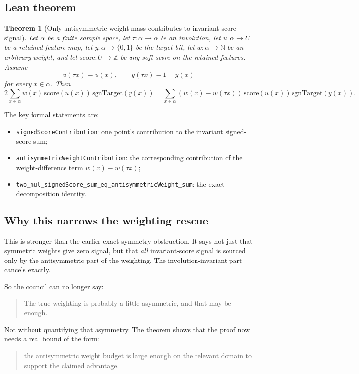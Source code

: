 \documentclass[11pt]{article}
\newtheorem{theorem}{Theorem}[section]
\theoremstyle{remark}
\begin{document}
\subsection{Lean theorem}

\begin{theorem}[Only antisymmetric weight mass contributes to invariant-score signal]
Let \(\alpha\) be a finite sample space, let \(\tau : \alpha \to \alpha\) be an involution, let
\(u : \alpha \to U\) be a retained feature map, let \(y : \alpha \to \{0,1\}\) be the target bit,
let \(w : \alpha \to \mathbb{N}\) be an arbitrary weight, and let
\(\mathrm{score} : U \to \mathbb{Z}\) be any soft score on the retained features.  Assume
\[
  u(\tau x) = u(x), \qquad y(\tau x) = 1-y(x)
\]
for every \(x \in \alpha\).  Then
\[
  2 \sum_{x \in \alpha} w(x)\,\mathrm{score}(u(x))\,\mathrm{sgnTarget}(y(x))
  =
  \sum_{x \in \alpha} (w(x)-w(\tau x))\,\mathrm{score}(u(x))\,\mathrm{sgnTarget}(y(x)).
\]
\end{theorem}

\noindent
The key formal statements are:
\begin{itemize}[leftmargin=1.5em]
  \item \texttt{signedScoreContribution}: one point's contribution to the invariant signed-score
  sum;
  \item \texttt{antisymmetricWeightContribution}: the corresponding contribution of the
  weight-difference term \(w(x)-w(\tau x)\);
  \item \texttt{two\_mul\_signedScore\_sum\_eq\_antisymmetricWeight\_sum}: the exact decomposition
  identity.
\end{itemize}

\subsection{Why this narrows the weighting rescue}

This is stronger than the earlier exact-symmetry obstruction.  It says not just that symmetric
weights give zero signal, but that \emph{all} invariant-score signal is sourced only by the
antisymmetric part of the weighting.  The involution-invariant part cancels exactly.

So the council can no longer say:
\begin{quote}
The true weighting is probably a little asymmetric, and that may be enough.
\end{quote}

Not without quantifying that asymmetry.  The theorem shows that the proof now needs a real bound of
the form:
\begin{quote}
the antisymmetric weight budget is large enough on the relevant domain to support the claimed
advantage.
\end{quote}
\end{document}
